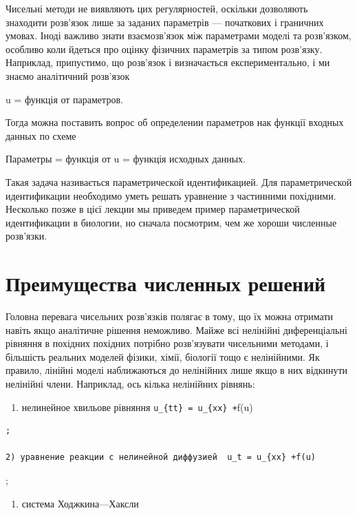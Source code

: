 \documentclass[
  ukrainian,
]{article}
\providecommand{\tightlist}{%
  \setlength{\itemsep}{0pt}\setlength{\parskip}{0pt}}
\begin{document}
Чисельні методи не виявляють цих регулярностей, оскільки дозволяють
знаходити розв'язок лише за заданих параметрів --- початкових і
граничних умовах. Іноді важливо знати взаємозв'язок між параметрами
моделі та розв'язком, особливо коли йдеться про оцінку фізичних
параметрів за типом розв'язку. Наприклад, припустимо, що розв'язок і
визначається експериментально, і ми знаємо аналітичний розв'язок

u = функція от параметров.

Тогда можна поставить вопрос об определении параметров нак функції
входных данных по схеме

Параметры = функція от u = функція исходных данных.

Такая задача називається параметрической идентификацией. Для
параметрической идентификации необходимо уметь решать уравнение з
частинними похідними. Несколько позже в цієї лекции мы приведем пример
параметрической идентификации в биологии, но сначала посмотрим, чем же
хороши численные розв'язки.

\section{Преимущества численных
решений}\label{ux43fux440ux435ux438ux43cux443ux449ux435ux441ux442ux432ux430-ux447ux438ux441ux43bux435ux43dux43dux44bux445-ux440ux435ux448ux435ux43dux438ux439-1}

Головна перевага чисельних розв'язків полягає в тому, що їх можна
отримати навіть якщо аналітичне рішення неможливо. Майже всі нелінійні
диференціальні рівняння в похідних похідних потрібно розв'язувати
чисельними методами, і більшість реальних моделей фізики, хімії,
біології тощо є нелінійними. Як правило, лінійні моделі наближаються до
нелінійних лише якщо в них відкинути нелінійні члени. Наприклад, ось
кілька нелінійних рівнянь:

\begin{enumerate}
\def\labelenumi{\arabic{enumi})}
\tightlist
\item
  нелинейное хвильове рівняння \texttt{u\_\{tt\}\ =\ u\_\{xx\}\ +}f(u)
\end{enumerate}

\begin{verbatim}
;

2) уравнение реакции с нелинейной диффузией  u_t = u_{xx} +f(u)
\end{verbatim}

;

\begin{enumerate}
\def\labelenumi{\arabic{enumi})}
\setcounter{enumi}{2}
\tightlist
\item
  система Ходжкина---Хаксли
\end{enumerate}
\end{document}
